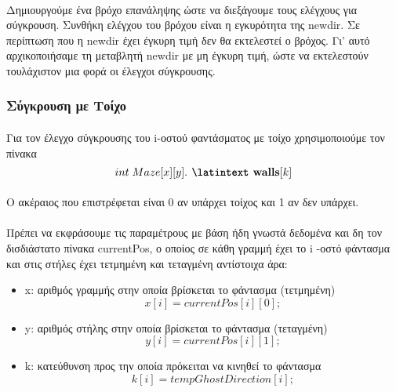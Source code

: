 \documentclass[12pt,a4paper]{article}
\newcommand{\lt}{\latintext}
\newcommand{\gt}{\greektext}
\begin{document}
\paragraph*{}	Δημιουργούμε ένα βρόχο επανάληψης ώστε να διεξάγουμε τους ελέγχους για σύγκρουση. Συνθήκη ελέγχου του βρόχου είναι η εγκυρότητα της {\lt newdir}. Σε περίπτωση που η {\lt newdir} έχει έγκυρη τιμή δεν θα εκτελεστεί ο βρόχος. Γι’ αυτό αρχικοποιήσαμε τη μεταβλητή {\lt newdir} με μη έγκυρη τιμή, ώστε να εκτελεστούν τουλάχιστον μια φορά οι έλεγχοι σύγκρουσης.
	
	\subsubsection{Σύγκρουση με Τοίχο}
\paragraph*{}	Για τον έλεγχο σύγκρουσης του \lt i\gt -οστού φαντάσματος με τοίχο χρησιμοποιούμε τον πίνακα 
	\begin{equation*}
	int\; Maze[x][y].\textbf{ \lt walls}[k]
	\end{equation*}
\paragraph*{}	Ο ακέραιος που επιστρέφεται είναι 0 αν υπάρχει τοίχος και 1 αν δεν
	υπάρχει.  \paragraph*{} Πρέπει να εκφράσουμε τις παραμέτρους με βάση ήδη γνωστά δεδομένα και δη τον δισδιάστατο πίνακα \lt currentPos, \gt ο οποίος σε κάθη γραμμή έχει το \lt i \gt-οστό φάντασμα και στις στήλες έχει τετμημένη και τεταγμένη αντίστοιχα άρα:
	
	 \begin{itemize}
		\item	 \lt x: \gt αριθμός γραμμής στην οποία βρίσκεται το φάντασμα (τετμημένη)
		\begin{equation*}
		x[i]= currentPos[i][0];
		\end{equation*}
		\item	 \lt y: \gt αριθμός στήλης στην οποία βρίσκεται το φάντασμα (τεταγμένη)
		\begin{equation*}
		y[i]=currentPos[i][1];
		\end{equation*}
		\item	 \lt k: \gt κατεύθυνση προς την οποία πρόκειται να κινηθεί το φάντασμα
		\begin{equation*}
		k[i]=tempGhostDirection[i];
		\end{equation*}	
	\end{itemize}
\end{document}

